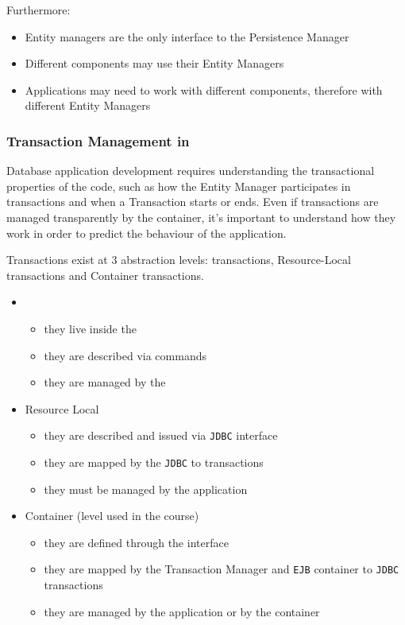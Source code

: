 \documentclass[english]{article}
\begin{document}
\bigskip
Furthermore:

\begin{itemize}
  \item Entity managers are the only interface to the Persistence Manager
  \item Different components may use their Entity Managers
  \item Applications may need to work with different components, therefore with different Entity Managers
\end{itemize}

\subsubsection{Transaction Management in \jpa}

Database application development requires understanding the transactional properties of the code, such as
how the Entity Manager participates in transactions and when a Transaction starts or ends.
Even if transactions are managed transparently by the container, it's important to understand how they work in order to predict the behaviour of the application.

Transactions exist at \(3\) abstraction levels: \dbms transactions, Resource-Local transactions and Container transactions.

\begin{itemize}
  \item \dbms
        \begin{itemize}
          \item they live inside the \dbms
          \item they are described via \sql commands
          \item they are managed by the \dbms
        \end{itemize}
  \item Resource Local
        \begin{itemize}
          \item they are described and issued via \texttt{JDBC} interface
          \item they are mapped by the \texttt{JDBC} to \dbms transactions
          \item they must be managed by the application
        \end{itemize}
  \item Container (level used in the course)
        \begin{itemize}
          \item they are defined through the \jta interface
          \item they are mapped by the \jta Transaction Manager and \texttt{EJB} container to \texttt{JDBC} transactions
          \item they are managed by the application or by the container
        \end{itemize}
\end{itemize}
\end{document}
